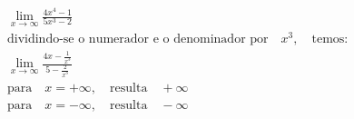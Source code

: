 \begin{ex}
\begin{align}
&\lim_{x\rightarrow \infty} \frac{4x^4-1}{5x^3-2}\nonumber\\
&\text{dividindo-se o numerador e o denominador por}\quad x^3,\quad\text{temos:}\nonumber\\
&\lim_{x\rightarrow \infty} \frac{4x-\frac{1}{x^3}}{5-\frac{2}{x^3}}\nonumber\\
&\text{para}\quad x=+\infty,\quad\text{resulta}\quad +\infty\nonumber\\
&\text{para}\quad x=-\infty,\quad\text{resulta}\quad -\infty\nonumber
\end{align}
\end{ex}